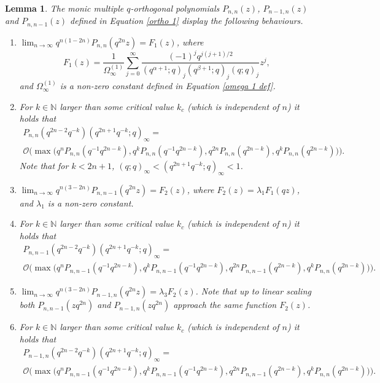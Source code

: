 \documentclass[a4paper,reqno]{amsart}
\numberwithin{equation}{section}
\newtheorem{lemma}[theorem]{Lemma}
\numberwithin{figure}{section}
\begin{document}
\begin{lemma}\label{Section 3 lemma}
    The monic multiple $q$-orthogonal polynomials $P_{n,n}(z)$, $P_{n-1,n}(z)$ and $P_{n,n-1}(z)$ defined in Equation \eqref{ortho 1} display the following behaviours.
    \begin{enumerate}
    \item $\lim_{n\to\infty} q^{n(1-2n)}P_{n,n}(q^{2n}z) =  F_1(z)$, where 
     \[F_1(z)=\frac{1}{\Omega^{(1)}_\infty}\sum_{j=0}^\infty \frac{(-1)^jq^{j(j+1)/2}}{(q^{\alpha+1};q)_j(q^{\beta+1};q)_j(q;q)_j}z^j,\]
     and $\Omega^{(1)}_\infty$ is a non-zero constant defined in Equation \eqref{omega 1 def}.
        \item For $k\in\mathbb{N}$ larger than some critical value $k_c$ (which is independent of $n$) it holds that
        \begin{multline}\nonumber
            P_{n,n}(q^{2n-2}q^{-k})(q^{2n+1}q^{-k};q)_\infty = \\ \mathcal{O}\Big(\max\big(q^{n}P_{n,n}(q^{-1}q^{2n-k}), q^{k}P_{n,n}(q^{-1}q^{2n-k}), q^{2n}P_{n,n}(q^{2n-k}),q^{k}P_{n,n}(q^{2n-k})\big)\Big).
        \end{multline}
        Note that for $k<2n+1$, $(q;q)_\infty<(q^{2n+1}q^{-k};q)_\infty<1$.
        \item $\lim_{n\to\infty} q^{n(3-2n)}P_{n,n-1}(q^{2n}z) = F_2(z)$, where $F_2(z)=\lambda_1F_1(qz)$, and $\lambda_1$ is a non-zero constant.
        \item For $k\in\mathbb{N}$ larger than some critical value $k_c$ (which is independent of $n$) it holds that
        \begin{multline}\nonumber 
            P_{n,n-1}(q^{2n-2}q^{-k})(q^{2n+1}q^{-k};q)_\infty = \\ \mathcal{O}\Big(\max\big(q^{n}P_{n,n-1}(q^{-1}q^{2n-k}), q^{k}P_{n,n-1}(q^{-1}q^{2n-k}), q^{2n}P_{n,n-1}(q^{2n-k}),q^{k}P_{n,n}(q^{2n-k})\big)\Big).
        \end{multline}
        \item $\lim_{n\to\infty} q^{n(3-2n)}P_{n-1,n}(q^{2n}z) = \lambda_3 F_2(z)$. Note that up to linear scaling both $P_{n,n-1}(zq^{2n})$ and $P_{n-1,n}(zq^{2n})$ approach the same function $F_2(z)$.
        \item For $k\in\mathbb{N}$ larger than some critical value $k_c$ (which is independent of $n$) it holds that
        \begin{multline}\nonumber
            P_{n-1,n}(q^{2n-2}q^{-k})(q^{2n+1}q^{-k};q)_\infty =  \\\mathcal{O}\Big(\max\big(q^{n}P_{n,n-1}(q^{-1}q^{2n-k}), q^{k}P_{n,n-1}(q^{-1}q^{2n-k}), q^{2n}P_{n,n-1}(q^{2n-k}),q^{k}P_{n,n}(q^{2n-k})\big)\Big).
        \end{multline}
    \end{enumerate}
\end{lemma}
\end{document}
